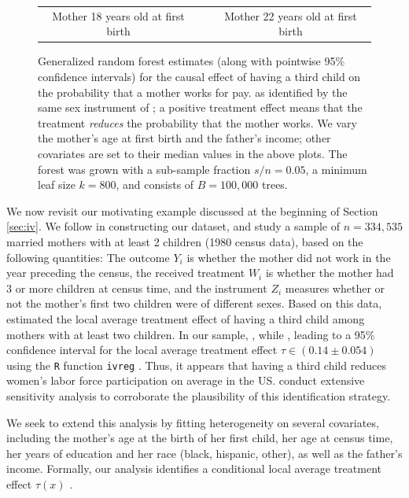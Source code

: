 \documentclass[aos]{imsart}
\theoremstyle{plain}
\theoremstyle{definition}
\theoremstyle{remark}
\begin{document}
\begin{CJK}{UTF8}{gbsn}
\begin{figure}
\begin{tabular}{ccc}
Mother 18 years old at first birth & & Mother 22 years old at first birth
\end{tabular}
\caption{Generalized random forest estimates (along with pointwise 95\% confidence intervals)
for the causal effect of having a third child on the probability
that a mother works for pay.
as identified by the same sex instrument of \citet{angrist1998children};
a positive treatment effect means that the treatment \emph{reduces} the probability that the mother works.
We vary the mother's age at first birth
and the father's income; other covariates are set to their median values in the above plots.
The forest was grown with a sub-sample fraction $s/n = 0.05$, a minimum leaf size $k = 800$, and
consists of $B = 100,000$ trees.}
\label{fig:familysize}
\vspace{-1.5\baselineskip}
\end{figure}

We now revisit our motivating example discussed at the beginning of Section \ref{sec:iv}.
We follow \citet{angrist1998children} in constructing our dataset, and
study a sample of $n = 334,535$ married mothers with at least 2 children (1980 census data),
based on the following quantities: The outcome $Y_i$ is whether the mother did not work in the
year preceding the census, the received treatment $W_i$ is whether the mother had 3 or more
children at census time, and the instrument $Z_i$ measures whether or not
the mother's first two children were of different sexes.
Based on this data, \citet{angrist1998children} estimated the local average treatment effect
of having a third child among mothers with at least two children.
In our sample, , while
, leading to a 95\% confidence interval for the
local average treatment effect $\tau \in (0.14 \pm 0.054)$ using the \texttt{R} function
\texttt{ivreg} \citep{kleiber2008applied}. Thus, it appears that having a third child reduces
women's labor force participation on average in the US.
\citet{angrist1998children} conduct extensive sensitivity analysis to corroborate the
plausibility of this identification strategy.

We seek to extend this analysis by fitting heterogeneity
on several covariates, including the mother's age at the birth of her first child, her age at census time,
her years of education and her race (black, hispanic, other), as well as the father's income. Formally, our analysis identifies
a conditional local average treatment effect $\tau(x)$ \citep{abadie2003semiparametric,imbens1994identification}.


\end{CJK}
\end{document}

